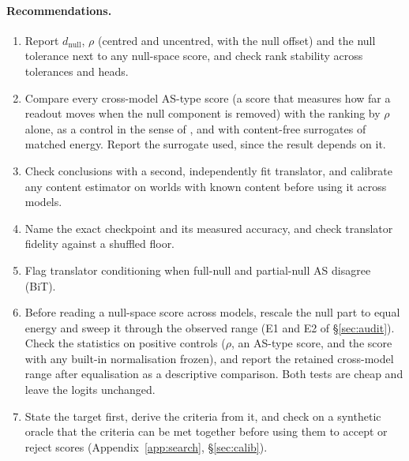 \documentclass[10pt]{article}
\begin{document}
\paragraph{Recommendations.}
\begin{enumerate}
\item Report $d_{\mathrm{null}}$, $\rho$ (centred and uncentred, with the null offset) and the null tolerance next to any null-space score, and check rank stability across tolerances and heads.
\item Compare every cross-model AS-type score (a score that measures how far a readout moves when the null component is removed) with the ranking by $\rho$ alone, as a control in the sense of \citet{hewitt2019control}, and with content-free surrogates of matched energy. Report the surrogate used, since the result depends on it.
\item Check conclusions with a second, independently fit translator, and calibrate any content estimator on worlds with known content before using it across models.
\item Name the exact checkpoint and its measured accuracy, and check translator fidelity against a shuffled floor.
\item Flag translator conditioning when full-null and partial-null AS disagree (BiT).
\item Before reading a null-space score across models, rescale the null part to equal energy and sweep it through the observed range (E1 and E2 of \S\ref{sec:audit}). Check the statistics on positive controls ($\rho$, an AS-type score, and the score with any built-in normalisation frozen), and report the retained cross-model range after equalisation as a descriptive comparison. Both tests are cheap and leave the logits unchanged.
\item State the target first, derive the criteria from it, and check on a synthetic oracle that the criteria can be met together before using them to accept or reject scores (Appendix~\ref{app:search}, \S\ref{sec:calib}).
\end{enumerate}
\end{document}
